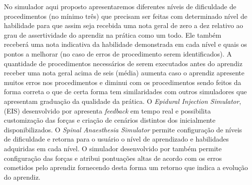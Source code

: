 No simulador aqui proposto apresentaremos diferentes níveis de dificuldade de procedimentos (no mínimo três) que precisam ser feitas com determinado nível de habilidade para que assim seja recebida uma nota geral de zero a dez relativo ao grau de assertividade do aprendiz na prática como um todo. Ele também receberá uma nota indicativa da habilidade demonstrada em cada nível e quais os pontos a melhorar (no caso de erros de procedimento serem identificados). A quantidade de procedimentos necessários de serem executados antes do aprendiz receber uma nota geral acima de seis (média) aumenta caso o aprendiz apresente muitos erros nos procedimentos e diminui com os procedimentos sendo feitos da forma correta o que de certa forma tem similaridades com outros simuladores que apresentam graduação da qualidade da prática. O \textit{Epidural Injection Simulator}, (EIS) desenvolvido por \textcite{Wilson2003} apresenta \textit{feedback} em tempo real e possibilita customização das forças e criação de cenários distintos dos inicialmente disponibilizados. O \textit{Spinal Anaesthesia Simulator} \cite{Albert2007,Dreifaldt2006} permite configuração de níveis de dificuldade e retorna para o usuário o nível de aprendizado e habilidades adquiridas em cada nível. O simulador desenvolvido por \textcite{Brazil2017} também permite configuração das forças e atribui pontuações altas de acordo com os erros cometidos pelo aprendiz fornecendo desta forma um retorno que indica a evolução do aprendiz. 
